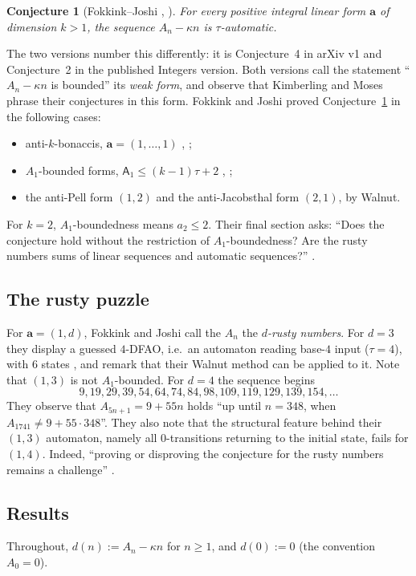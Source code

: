 \documentclass[11pt]{amsart}
\newtheorem{conjecture}[theorem]{Conjecture}
\theoremstyle{definition}
\theoremstyle{remark}
\begin{document}
\begin{conjecture}[Fokkink--Joshi {\cite[Conj.~4]{FJarxiv}}, {\cite[Conj.~2]{FJ}}]\label{conj:FJ}
For every positive integral linear form $\mathbf a$ of dimension $k>1$, the sequence $A_n-\kappa n$ is $\tau$-automatic.
\end{conjecture}

The two versions number this differently: it is Conjecture~4 in arXiv v1 and Conjecture~2 in the published Integers version. Both versions call the statement ``$A_n-\kappa n$ is bounded'' its \emph{weak form}, and observe that Kimberling and Moses phrase their conjectures in this form. Fokkink and Joshi proved Conjecture~\ref{conj:FJ} in the following cases:
\begin{itemize}
\item anti-$k$-bonaccis, $\mathbf a=(1,\dots,1)$ \cite[Thm.~8]{FJarxiv}, \cite[Thm.~3]{FJ};
\item $A_1$-bounded forms, $\mathsf A_1\le(k-1)\tau+2$ \cite[Thm.~12]{FJarxiv}, \cite[Thm.~4]{FJ};
\item the anti-Pell form $(1,2)$ and the anti-Jacobsthal form $(2,1)$, by Walnut.
\end{itemize}
For $k=2$, $A_1$-boundedness means $a_2\le 2$. Their final section asks: ``Does the conjecture hold without the restriction of $A_1$-boundedness? Are the rusty numbers sums of linear sequences and automatic sequences?'' \cite[\S6]{FJ}.

\subsection{The rusty puzzle}
For $\mathbf a=(1,d)$, Fokkink and Joshi call the $A_n$ the \emph{$d$-rusty numbers}. For $d=3$ they display a guessed $4$-DFAO, i.e.\ an automaton reading base-$4$ input ($\tau=4$), with $6$ states \cite[Fig.~7]{FJ}, and remark that their Walnut method can be applied to it. Note that $(1,3)$ is not $A_1$-bounded. For $d=4$ the sequence begins
\[
9,19,29,39,54,64,74,84,98,109,119,129,139,154,\dots
\]
They observe that $A_{5n+1}=9+55n$ holds ``up until $n=348$, when $A_{1741}\neq 9+55\cdot348$''. They also note that the structural feature behind their $(1,3)$ automaton, namely all $0$-transitions returning to the initial state, fails for $(1,4)$. Indeed, ``proving or disproving the conjecture for the rusty numbers remains a challenge'' \cite[\S5]{FJ}.

\subsection{Results}
Throughout, $d(n):=A_n-\kappa n$ for $n\ge1$, and $d(0):=0$ (the convention $A_0=0$).
\end{document}
